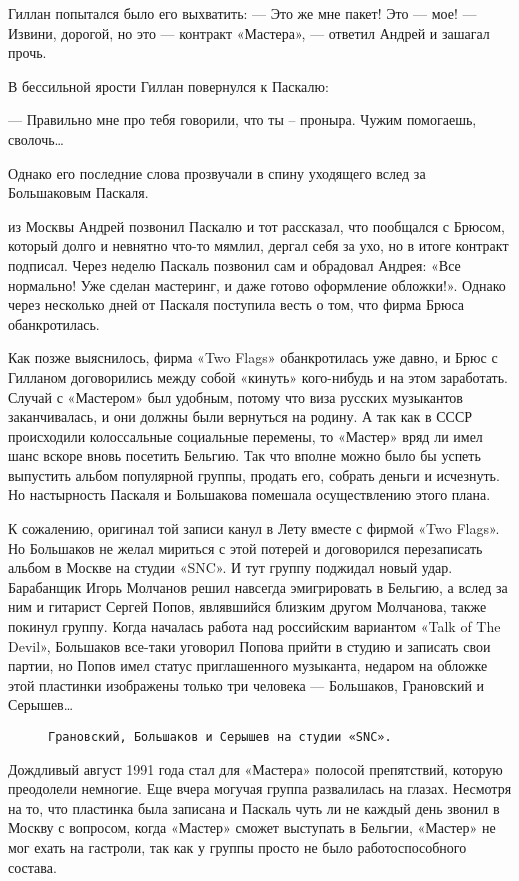 Гиллан попытался было его выхватить:
— Это же мне пакет! Это — мое!
— Извини, дорогой, но это — контракт «Мастера», — ответил Андрей и зашагал прочь.

В бессильной ярости Гиллан повернулся к Паскалю:

— Правильно мне про тебя говорили, что ты – проныра. Чужим помогаешь, сволочь\ldots

Однако его последние слова прозвучали в спину уходящего вслед за Большаковым Паскаля.

 из Москвы Андрей позвонил Паскалю и тот рассказал, что пообщался с Брюсом, который долго и невнятно что-то
мямлил, дергал себя за ухо, но в итоге контракт подписал. Через неделю Паскаль позвонил сам и обрадовал Андрея: «Все
нормально! Уже сделан мастеринг, и даже готово оформление обложки!». Однако через несколько дней от Паскаля поступила
весть о том, что фирма Брюса обанкротилась.

Как позже выяснилось, фирма «Two Flags» обанкротилась уже давно, и Брюс с Гилланом договорились между собой «кинуть»
кого-нибудь и на этом заработать. Случай с «Мастером» был удобным, потому что виза русских музыкантов заканчивалась, и
они должны были вернуться на родину. А так как в СССР происходили колоссальные социальные перемены, то «Мастер» вряд ли
имел шанс вскоре вновь посетить Бельгию. Так что вполне можно было бы успеть выпустить альбом популярной группы, продать
его, собрать деньги и исчезнуть. Но настырность Паскаля и Большакова помешала осуществлению этого плана.

К сожалению, оригинал той записи канул в Лету вместе с фирмой «Two Flags». Но Большаков не желал мириться с этой потерей
и договорился перезаписать альбом в Москве на студии «SNC». И тут группу поджидал новый удар. Барабанщик Игорь Молчанов
решил навсегда эмигрировать в Бельгию, а вслед за ним и гитарист Сергей Попов, являвшийся близким другом Молчанова,
также покинул группу. Когда началась работа над российским вариантом «Talk of The Devil», Большаков все-таки уговорил
Попова прийти в студию и записать свои партии, но Попов имел статус приглашенного музыканта, недаром на обложке этой
пластинки изображены только три человека — Большаков, Грановский и Серышев\ldots

\begin{figure}[h]
    \centering
    \caption{\texttt{Грановский, Большаков и Серышев на студии «SNC».}}
\end{figure}

Дождливый август 1991 года стал для «Мастера» полосой препятствий, которую преодолели немногие. Еще вчера могучая группа
развалилась на глазах. Несмотря на то, что пластинка была записана и Паскаль чуть ли не каждый день звонил в Москву с
вопросом, когда «Мастер» сможет выступать в Бельгии, «Мастер» не мог ехать на гастроли, так как у группы просто не было
работоспособного состава.


